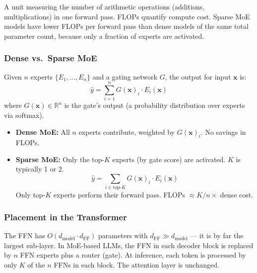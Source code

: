 \documentclass[11pt, a4paper]{article}
\begin{document}
\begin{defbox}
A unit measuring the number of arithmetic operations (additions, multiplications) in one forward pass. FLOPs quantify compute cost. Sparse MoE models have lower FLOPs per forward pass than dense models of the same total parameter count, because only a fraction of experts are activated.
\end{defbox}

\subsubsection{Dense vs.\ Sparse MoE}

\begin{defbox}
Given $n$ experts $\{E_1, \ldots, E_n\}$ and a gating network $G$, the output for input $\mathbf{x}$ is:
\[
\hat{y} = \sum_{i=1}^{n} G(\mathbf{x})_i \cdot E_i(\mathbf{x})
\]
where $G(\mathbf{x}) \in \mathbb{R}^n$ is the gate's output (a probability distribution over experts via softmax).
\end{defbox}

\begin{itemize}[leftmargin=2em]
  \item \textbf{Dense MoE:} All $n$ experts contribute, weighted by $G(\mathbf{x})_i$. No savings in FLOPs.
  \item \textbf{Sparse MoE:} Only the top-$K$ experts (by gate score) are activated. $K$ is typically 1 or 2.
\[
\hat{y} = \sum_{i \in \text{top-}K} G(\mathbf{x})_i \cdot E_i(\mathbf{x})
\]
Only top-$K$ experts perform their forward pass. FLOPs $\approx K/n \times$ dense cost.
\end{itemize}

\subsubsection{Placement in the Transformer}

\begin{notebox}
The FFN has $O(d_{\text{model}} \cdot d_{\text{FF}})$ parameters with $d_{\text{FF}} \gg d_{\text{model}}$ --- it is by far the largest sub-layer. In MoE-based LLMs, the FFN in each decoder block is replaced by $n$ FFN experts plus a router (gate). At inference, each token is processed by only $K$ of the $n$ FFNs in each block. The attention layer is unchanged.
\end{notebox}
\end{document}
